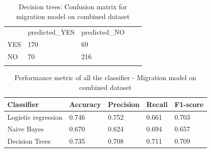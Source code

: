 \begin{table}[]
\centering
\begin{tabular}{lllll}
\cline{1-3}
\multicolumn{1}{|l|}{}   & \multicolumn{1}{l|}{predicted\_YES} & \multicolumn{1}{l|}{predicted\_NO}  &  &  \\ \cline{1-3}
\multicolumn{1}{|l|}{YES} & \multicolumn{1}{l|}{170}  & \multicolumn{1}{l|}{69} &  &  \\ \cline{1-3}
\multicolumn{1}{|l|}{NO}   & \multicolumn{1}{l|}{70}  & \multicolumn{1}{l|}{216}  &  &  \\ \cline{1-3}
                            &                           &                           &  & 
\end{tabular}
\caption{Decision trees: Confusion matrix for migration model on combined dataset}
\label{tab:confusionmatrix_migrationtweets_com_DT}
\end{table}

\begin{table}[]
\centering
\begin{tabular}{lllll}
\hline
\textbf{Classifier} & \textbf{Accuracy} & \textbf{Precision} & \textbf{Recall} & \textbf{F1-score} \\ \hline
Logistic regression & 0.746           & 0.752              & 0.661           & 0.703            \\ \hline
Naive Bayes         & 0.670             & 0.624              & 0.694           & 0.657             \\ \hline
Decision Trees     & 0.735             & 0.708              & 0.711           & 0.709             \\ \hline
\end{tabular}
\caption{Performance metric of all the classifier - Migration model on combined dataset}
\label{tab:sentiment_metric_com}
\end{table}


